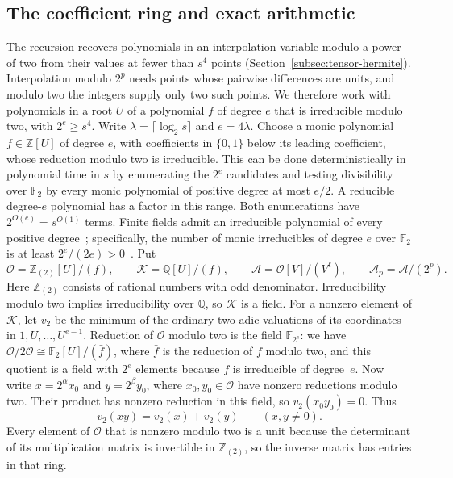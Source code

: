 \subsection{The coefficient ring and exact arithmetic}
\label{subsec:tensor-arithmetic}

The recursion recovers polynomials in an interpolation variable modulo
a power of two from their values at fewer than $s^4$ points
(Section~\ref{subsec:tensor-hermite}). Interpolation modulo $2^p$ needs
points whose pairwise differences are units, and modulo two the integers
supply only two such points. We therefore work with polynomials in a
root $U$ of a polynomial $f$ of degree $e$ that is irreducible modulo
two, with $2^e\ge s^4$.
Write $\lambda=\lceil\log_2 s\rceil$ and $e=4\lambda$.
Choose a monic polynomial $f\in\mathbb Z[U]$ of degree $e$, with
coefficients in $\{0,1\}$ below its leading coefficient, whose reduction
modulo two is irreducible.  This can be done deterministically in
polynomial time in $s$ by enumerating the $2^e$ candidates and testing
divisibility over $\mathbb F_2$ by every monic polynomial of positive
degree at most $e/2$. A reducible degree-$e$ polynomial has a factor
in this range. Both enumerations have $2^{O(e)}=s^{O(1)}$ terms.
Finite fields admit an irreducible polynomial of every positive
degree~\cite{vzGG13}; specifically, the number of monic irreducibles
of degree $e$ over $\mathbb F_2$ is at least
$2^e/(2e)>0$~\cite[Theorem~19.12]{Shoup09}.
Put
\[
 \mathcal O=\mathbb Z_{(2)}[U]/(f),\qquad
 \mathcal K=\mathbb Q[U]/(f),\qquad
 \mathcal A=\mathcal O[V]/(V^\ell),\qquad
 \mathcal A_p=\mathcal A/(2^p).
\]
Here $\mathbb Z_{(2)}$ consists of rational numbers with odd
denominator.  Irreducibility modulo two implies irreducibility over
$\mathbb Q$, so $\mathcal K$ is a field.  For a nonzero element of
$\mathcal K$, let $v_2$ be the minimum of the ordinary two-adic
valuations of its coordinates in $1,U,\ldots,U^{e-1}$.
Reduction of $\mathcal O$ modulo two is the field $\mathbb F_{2^e}$:
we have $\mathcal O/2\mathcal O\cong\mathbb F_2[U]/(\bar f)$, where
$\bar f$ is the reduction of $f$ modulo two, and this quotient is a
field with $2^e$ elements because $\bar f$ is irreducible of
degree~$e$. Now write $x=2^\alpha x_0$ and $y=2^\beta y_0$, where
$x_0,y_0\in\mathcal O$ have nonzero reductions modulo two.
Their product has nonzero reduction in this field, so
$v_2(x_0y_0)=0$. Thus
\[
 v_2(xy)=v_2(x)+v_2(y)\qquad(x,y\ne0).
\]
Every element of $\mathcal O$ that is nonzero modulo two is a unit because
the determinant of its multiplication matrix is invertible in
$\mathbb Z_{(2)}$, so the inverse matrix has entries in that ring.

